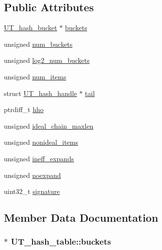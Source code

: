 \subsection*{Public Attributes}
\begin{DoxyCompactItemize}
\item 
\hyperlink{struct_u_t__hash__bucket}{U\+T\+\_\+hash\+\_\+bucket} $\ast$ \hyperlink{struct_u_t__hash__table_a04556bbef9c9a1c40b1bc0d17a2a6e0b}{buckets}
\item 
unsigned \hyperlink{struct_u_t__hash__table_a3ed04b6233facaedf910672578d86339}{num\+\_\+buckets}
\item 
unsigned \hyperlink{struct_u_t__hash__table_ae376a7f3fac525f3a9d03b6beec8d12f}{log2\+\_\+num\+\_\+buckets}
\item 
unsigned \hyperlink{struct_u_t__hash__table_a74534cc14f080c96f94d8f5da83d9d76}{num\+\_\+items}
\item 
struct \hyperlink{struct_u_t__hash__handle}{U\+T\+\_\+hash\+\_\+handle} $\ast$ \hyperlink{struct_u_t__hash__table_a00a889a5e1ebaeec0a83ec2701df1992}{tail}
\item 
ptrdiff\+\_\+t \hyperlink{struct_u_t__hash__table_afd05f4d9e45354fb010367ae9e1bddb6}{hho}
\item 
unsigned \hyperlink{struct_u_t__hash__table_a5f1cec93d5d753ba02097c797e4d67ad}{ideal\+\_\+chain\+\_\+maxlen}
\item 
unsigned \hyperlink{struct_u_t__hash__table_a8cb66cfb259a204cda59a815e4db664f}{nonideal\+\_\+items}
\item 
unsigned \hyperlink{struct_u_t__hash__table_a216c7d98cf40a0064bee94aa8a5bf1b7}{ineff\+\_\+expands}
\item 
unsigned \hyperlink{struct_u_t__hash__table_a635661789933752e7b83dac84430eae1}{noexpand}
\item 
uint32\+\_\+t \hyperlink{struct_u_t__hash__table_a87d1ab3f3ede1809c6a485972d20b25f}{signature}
\end{DoxyCompactItemize}


\subsection{Member Data Documentation}
\subsubsection[{\texorpdfstring{buckets}{buckets}}]{$\ast$ U\+T\+\_\+hash\+\_\+table\+::buckets}\hypertarget{struct_u_t__hash__table_a04556bbef9c9a1c40b1bc0d17a2a6e0b}{}\label{struct_u_t__hash__table_a04556bbef9c9a1c40b1bc0d17a2a6e0b}
